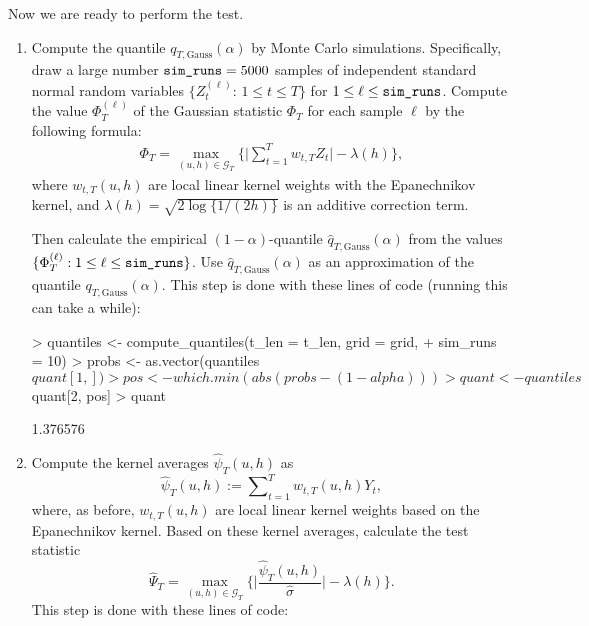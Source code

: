 \documentclass[a4paper]{scrartcl}
\begin{document}
Now we are ready to perform the test.
\begin{enumerate}[label=\textit{Step \arabic*.}, leftmargin=1.45cm]
  \item Compute the quantile $q_{T,\text{Gauss}}(\alpha)$ by Monte Carlo simulations. Specifically, draw a large number $\verb|sim_runs| = 5000$ samples of independent standard normal random variables $\{Z_{t}^{(\ell)} : \, 1 \le t \le T \}$ for $1 \le \ell \le \verb|sim_runs|$. Compute the value $\Phi_T^{(\ell)}$ of the Gaussian statistic $\Phi_T$ for each sample $\ell$ by the following formula:
\begin{align*}
\Phi_T = \max_{(u, h) \in \mathcal{G}_T}\bigg\{ \Big|\sum\limits_{t=1}^T w_{t, T} Z_{t}\Big| - \lambda(h) \bigg\},
\end{align*}
where $w_{t, T}(u, h)$ are local linear kernel weights with the Epanechnikov kernel, and $\lambda(h) = \sqrt{2 \log \{ 1/(2h) \}}$ is an additive correction term.

Then calculate the empirical $(1-\alpha)$-quantile $\widehat{q}_{T,\text{Gauss}}(\alpha)$ from the values $\{ \Phi_T^{(\ell)}: 1 \le \ell \le \verb|sim_runs| \}$. Use $\widehat{q}_{T,\text{Gauss}}(\alpha)$ as an approximation of the quantile $q_{T,\text{Gauss}}(\alpha)$.
This step is done with these lines of code (running this can take a while):

\begin{Schunk}
\begin{Sinput}
> quantiles <- compute_quantiles(t_len = t_len, grid = grid,
+                                sim_runs = 10)
> probs <- as.vector(quantiles$quant[1, ])
> pos   <- which.min(abs(probs - (1 - alpha)))
> quant <- quantiles$quant[2, pos]
> quant
\end{Sinput}
\begin{Soutput}
[1] 1.376576
\end{Soutput}
\end{Schunk}
  \item Compute the kernel averages $\widehat{\psi}_{T}(u, h)$ as
  \begin{equation*}
 \widehat{\psi}_{T}(u, h) := \sum\nolimits_{t=1}^T w_{t, T}(u, h) Y_{t},
\end{equation*}
where, as before, $w_{t, T}(u, h)$ are local linear kernel weights based on the Epanechnikov kernel. Based on these kernel averages, calculate the test statistic
$$\widehat{\Psi}_{T} = \max_{(u, h)\in \mathcal{G}_T} \bigg\{ \Big| \frac{\widehat{\psi}_{T}(u, h) }{\widehat{\sigma}}\Big| - \lambda(h) \Bigg\}.$$
This step is done with these lines of code:


\end{enumerate}
\end{document}

